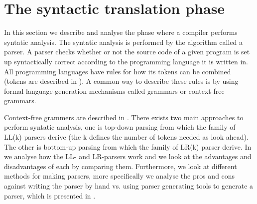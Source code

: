 \section{The syntactic translation phase}
\label{sec:syntacticanalysis}

In this section we describe and analyse the phase where a compiler performs
syntatic analysis. The syntatic analysis is performed by the algorithm called a
parser. A parser checks whether or not the source code of a given program is set
up syntactically correct according to the programming language it is written in.
All programming languages have rules for how its tokens can be combined (tokens
are described in ).  A common way to describe these
rules is by using formal language-generation mechanisms called grammars or
context-free grammars. 

Context-free grammers are described in .  There
exists two main approaches to perform syntatic analysis, one is top-down parsing
from which the family of LL(k) parsers derive (the k defines the number of
tokens needed as look ahead). The other is bottom-up parsing from which the
family of LR(k) parser derive.  In  we
analyse how the LL- and LR-parsers work and we look at the advantages and
disadvantages of each by comparing them. Furthermore, we look at different
methods for making parsers, more specifically we analyse the pros and cons
against writing the parser by hand vs. using parser generating tools to generate
a parser, which is presented in .





